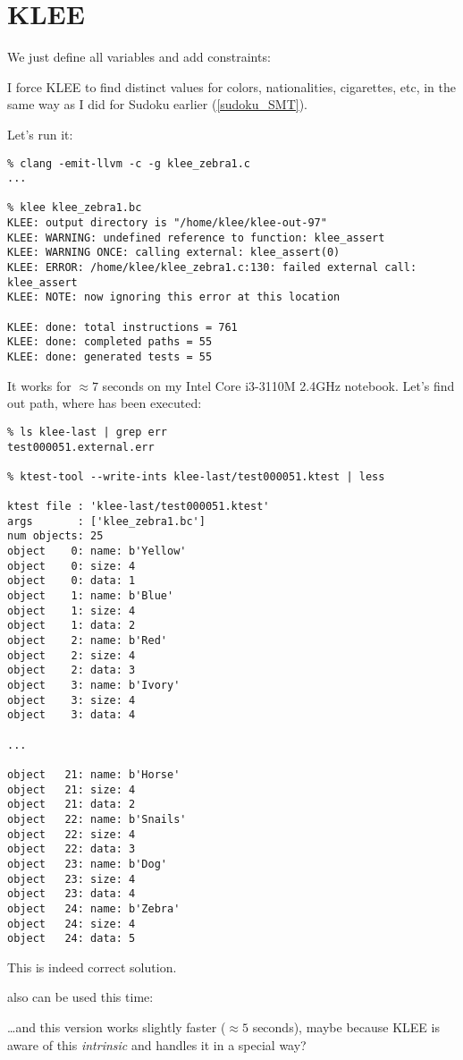 \section{KLEE}

\renewcommand{\CURPATH}{puzzles/zebra/KLEE}

We just define all variables and add constraints:



I force KLEE to find distinct values for colors, nationalities, cigarettes, etc, in the same way as I did for Sudoku earlier 
(\ref{sudoku_SMT}).

Let's run it:

\begin{lstlisting}
% clang -emit-llvm -c -g klee_zebra1.c
...

% klee klee_zebra1.bc
KLEE: output directory is "/home/klee/klee-out-97"
KLEE: WARNING: undefined reference to function: klee_assert
KLEE: WARNING ONCE: calling external: klee_assert(0)
KLEE: ERROR: /home/klee/klee_zebra1.c:130: failed external call: klee_assert
KLEE: NOTE: now ignoring this error at this location

KLEE: done: total instructions = 761
KLEE: done: completed paths = 55
KLEE: done: generated tests = 55
\end{lstlisting}

It works for $\approx 7$ seconds on my Intel Core i3-3110M 2.4GHz notebook.
Let's find out path, where  has been executed:

\begin{lstlisting}
% ls klee-last | grep err
test000051.external.err

% ktest-tool --write-ints klee-last/test000051.ktest | less

ktest file : 'klee-last/test000051.ktest'
args       : ['klee_zebra1.bc']
num objects: 25
object    0: name: b'Yellow'
object    0: size: 4
object    0: data: 1
object    1: name: b'Blue'
object    1: size: 4
object    1: data: 2
object    2: name: b'Red'
object    2: size: 4
object    2: data: 3
object    3: name: b'Ivory'
object    3: size: 4
object    3: data: 4

...

object   21: name: b'Horse'
object   21: size: 4
object   21: data: 2
object   22: name: b'Snails'
object   22: size: 4
object   22: data: 3
object   23: name: b'Dog'
object   23: size: 4
object   23: data: 4
object   24: name: b'Zebra'
object   24: size: 4
object   24: data: 5
\end{lstlisting}

This is indeed correct solution.

 also can be used this time:



\dots and this version works slightly faster ($\approx 5$ seconds),
maybe because KLEE is aware of this \emph{intrinsic} and handles it in a special way?

